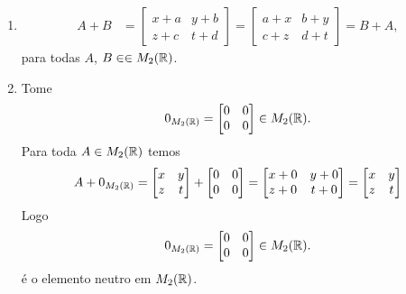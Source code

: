 \documentclass[12pt]{exam}
\begin{document}
\begin{enumerate}[label={\roman*})]
    \item 
    \begin{align*}
        A + B &= 
        \begin{bmatrix}
            x + a & y + b\\z + c & t + d 
        \end{bmatrix} = \begin{bmatrix}
            a + x & b + y\\c + z & d + t
        \end{bmatrix} = B + A,
    \end{align*}
    para todas $A$, $B \in \in M_2(\mathbb{R})$.

    \item Tome
    \[
        0_{M_2(\mathbb{R})} = \begin{bmatrix}
            0 & 0\\0 & 0
        \end{bmatrix} \in M_2(\mathbb{R}).
    \]
    Para toda $A \in M_2(\mathbb{R})$ temos
    \begin{align}
        A + 0_{M_2(\mathbb{R})} = \begin{bmatrix}
        x & y\\
        z & t
    \end{bmatrix} + \begin{bmatrix}
        0 & 0\\
        0 & 0
    \end{bmatrix} = \begin{bmatrix}
        x + 0& y + 0\\
        z + 0& t + 0
    \end{bmatrix} = \begin{bmatrix}
        x & y\\
        z & t
    \end{bmatrix}
    \end{align}
    Logo
    \[
        0_{M_2(\mathbb{R})} = \begin{bmatrix}
            0 & 0\\0 & 0
        \end{bmatrix} \in M_2(\mathbb{R}).
    \]
    \'e o elemento neutro em $M_2(\mathbb{R})$.


\end{enumerate}
\end{document}
